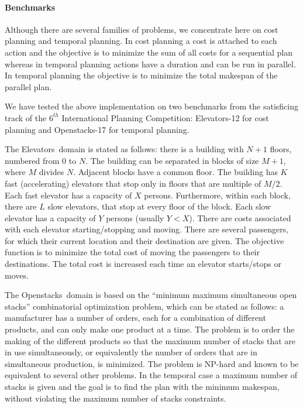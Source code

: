 \documentclass{sig-alternate}
\newcommand{\OPENSTACKS}{{\sc Openstacks}}
\newcommand{\ELEVATORS}{{\sc Elevators}}
\begin{document}
\paragraph{Benchmarks}
Although there are several families of problems, we concentrate here on cost planning and temporal
planning. In cost planning a cost is attached to each action and the objective
is to minimize the sum of all costs for a sequential plan whereas in temporal
planning actions have a duration and can be run in parallel. In temporal
planning the objective is to minimize the total makespan of the parallel plan.

We have tested the above implementation on two benchmarks from the satisficing track of the $6^{th}$ International Planning Competition: \ELEVATORS-12 for cost planning and \OPENSTACKS-17 for temporal planning.

The \ELEVATORS\ domain is stated as follows: there is a building with $N+1$ floors,
numbered from $0$ to $N$. The building can be separated in blocks of size $M+1$, where
$M$ divides $N$. Adjacent blocks have a common floor. The building has $K$ fast
(accelerating) elevators that stop only in floors that are multiple of $M/2$. 
Each fast elevator has a capacity of $X$ persons.
Furthermore, within each block, there are $L$ slow elevators, that stop at every
floor of the block. Each slow elevator has a capacity of $Y$ persons (usually
$Y<X$). There are costs associated with each elevator starting/stopping and
moving. There are several passengers, for which their current location and their
destination are given. The objective function is to minimize the total cost of
moving the passengers to their destinations. The total cost is increased each
time an elevator starts/stops or moves.

The \OPENSTACKS\ domain is based on the ``minimum maximum simultaneous open stacks''
combinatorial optimization problem, which can be stated as follows: a
manufacturer has a number of orders, each for a combination of different
products, and can only make one product at a time. The problem is to order the
making of the different products so that the maximum number of stacks that are
in use simultaneously, or equivalently the number of orders that are in
simultaneous production, is minimized. The problem is NP-hard and known to be
equivalent to several other problems. In the temporal case a maximum number of
stacks is given and the goal is to find the plan with the minimum makespan,
without violating the maximum number of stacks constraints.
\end{document}
